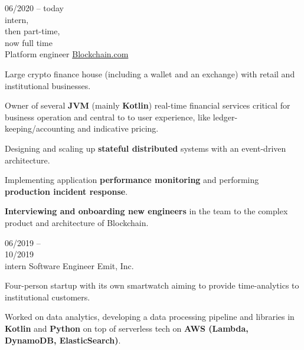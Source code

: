 \begin{entrylist}
    \entry
    {
        06/2020 -- today\\\footnotesize{intern,\\then part-time, \\now full time}\\
    }
    {Platform engineer}
    {\href{https://blockchain.com/about}{Blockchain.com}}
    {
        Large crypto finance house (including a wallet and an exchange) with retail and
    institutional businesses.

    \para
    Owner of several \textbf{JVM} (mainly \textbf{Kotlin}) real-time financial services critical for business operation and central to
    to user experience, like ledger-keeping/accounting and indicative pricing.

    \para
    Designing and scaling up \textbf{stateful distributed} systems with an event-driven architecture.

    \para
    Implementing application \textbf{performance monitoring} and performing \textbf{production incident response}.

    \para
    \textbf{Interviewing and onboarding new engineers} in the team to the complex product and architecture of Blockchain.

    }
    \entry
    {06/2019 -- \\ 10/2019\\\footnotesize{intern}}
    {Software Engineer}
    {Emit, Inc.}
    {
        Four-person startup with its own smartwatch aiming to provide time-analytics to
        institutional customers.

        \para
        Worked on data analytics, developing a data processing pipeline and libraries in
    \textbf{Kotlin} and \textbf{Python} on top of serverless tech on \textbf{AWS (Lambda,
        DynamoDB, ElasticSearch)}.
    }
\end{entrylist}
